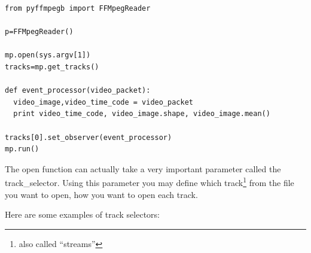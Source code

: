 \documentclass{report}
\begin{document}
\begin{lstlisting}
from pyffmpegb import FFMpegReader

p=FFMpegReader()

mp.open(sys.argv[1])
tracks=mp.get_tracks()

def event_processor(video_packet):
  video_image,video_time_code = video_packet
  print video_time_code, video_image.shape, video_image.mean()

tracks[0].set_observer(event_processor)
mp.run()

\end{lstlisting}











The open function can actually take a very important parameter called the track\_selector.
Using this parameter you may define which track\footnote{also called ``streams''} from the file you want to open,  how you want to open each track.

Here are some examples of track selectors:
\end{document}
